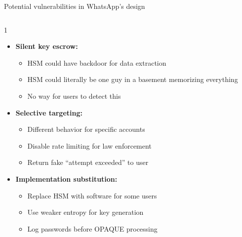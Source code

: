 \ifdefined\PRESENTATION\else\PassOptionsToClass{handout}{beamer}\fi\documentclass[aspectratio=169, lualatex]{beamer}
\begin{document}
\begin{frame}{Potential vulnerabilities in WhatsApp's design}
	\begin{columns}[c]
		\begin{column}{1\textwidth}
			\begin{itemize}
				\item \textbf{Silent key escrow:}
				      \begin{itemize}
					      \item HSM could have backdoor for data extraction
					      \item HSM could literally be one guy in a basement memorizing everything
					      \item No way for users to detect this
				      \end{itemize}
				\item \textbf{Selective targeting:}
				      \begin{itemize}
					      \item Different behavior for specific accounts
					      \item Disable rate limiting for law enforcement
					      \item Return fake ``attempt exceeded'' to user
				      \end{itemize}
				\item \textbf{Implementation substitution:}
				      \begin{itemize}
					      \item Replace HSM with software for some users
					      \item Use weaker entropy for key generation
					      \item Log passwords before OPAQUE processing
				      \end{itemize}
			\end{itemize}
		\end{column}
	\end{columns}
\end{frame}
\end{document}
